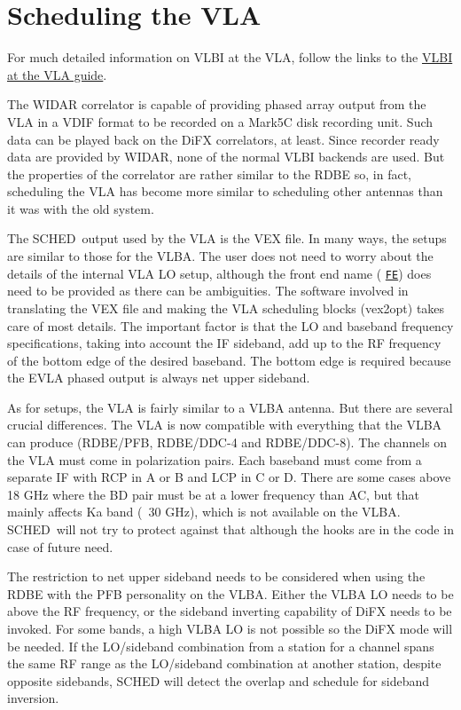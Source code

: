 \documentclass{report}
\newcommand{\schedb}{{\sc SCHED~}}
\begin{document}
\section{\label{SEC:VLA}Scheduling the VLA}

For much detailed information on VLBI at the VLA, follow the links to
the 
{\href{https://science.nrao.edu/facilities/vla/docs/manuals/obsguide/modes/vlbi}{VLBI at the VLA guide}}.

The WIDAR correlator is capable of providing phased array output from
the VLA in a VDIF format to be recorded on a Mark5C disk recording 
unit.  Such data can be played back on the DiFX correlators, at least.
Since
recorder ready data are provided by WIDAR, none of the normal VLBI
backends are used.  But the properties of the correlator are rather 
similar to the RDBE so, in fact, scheduling the VLA has become more
similar to scheduling other antennas than it was with the old system.

The \schedb output used by the VLA is the VEX file.  In many ways, the
setups are similar to those for the VLBA.  The user does not need to
worry about the details of the internal VLA LO setup, although the front
end name (
{\hyperref[SP:FE]{{\tt FE}}}) does need to be provided as there
can be ambiguities.  The software involved in translating the VEX file
and making the VLA scheduling blocks (vex2opt) takes care of most
details.  The important factor is that the LO and baseband frequency
specifications, taking into account the IF sideband, add up to the
RF frequency of the bottom edge of the desired baseband.  The bottom
edge is required because the EVLA phased output is always net upper
sideband.  

As for setups, the VLA is fairly similar to a VLBA antenna.  But there
are several crucial differences.  The VLA is now compatible with 
everything that the VLBA can produce (RDBE/PFB, RDBE/DDC-4 and RDBE/DDC-8).
The channels on the VLA must come in polarization pairs.  Each baseband must come from a
separate IF with RCP in A or B and LCP in C or D.  There are some
cases above 18 GHz where the BD pair must be at a lower frequency than
AC, but that mainly affects Ka band (~30 GHz), which is not available
on the VLBA.  \schedb will not try to protect against that although
the hooks are in the code in case of future need.

The restriction to net upper sideband needs to be considered when
using the RDBE with the PFB personality on the VLBA.  Either the VLBA
LO needs to be above the RF frequency, or the sideband inverting
capability of DiFX needs to be invoked.  For some bands, a high VLBA
LO is not possible so the DiFX mode will be needed.  If the LO/sideband
combination from a station for a channel spans the same RF range as
the LO/sideband combination at another station, despite opposite
sidebands, SCHED will detect the overlap and schedule for sideband
inversion.
\end{document}
